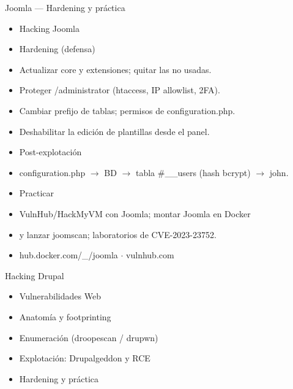\documentclass[aspectratio=169,10pt]{beamer}
\begin{document}
\begin{frame}[allowframebreaks]{Joomla --- Hardening y práctica}
\small
  \begin{itemize}
  \item Hacking Joomla
  \item Hardening (defensa)
  \item Actualizar core y extensiones; quitar las no usadas.
  \item Proteger /administrator (htaccess, IP allowlist, 2FA).
  \item Cambiar prefijo de tablas; permisos de configuration.php.
  \item Deshabilitar la edición de plantillas desde el panel.
  \item Post-explotación
  \item configuration.php $\rightarrow$ BD $\rightarrow$ tabla \#\_\_users (hash bcrypt) $\rightarrow$ john.
  \item Practicar
  \item VulnHub/HackMyVM con Joomla; montar Joomla en Docker
  \item y lanzar joomscan; laboratorios de CVE-2023-23752.
  \item hub.docker.com/\_/joomla $\cdot$ vulnhub.com
  \end{itemize}
\end{frame}

\begin{frame}[allowframebreaks]{Hacking Drupal}
\small
  \begin{itemize}
  \item Vulnerabilidades Web
  \item Anatomía y footprinting
  \item Enumeración (droopescan / drupwn)
  \item Explotación: Drupalgeddon y RCE
  \item Hardening y práctica
  \end{itemize}
\end{frame}
\end{document}
